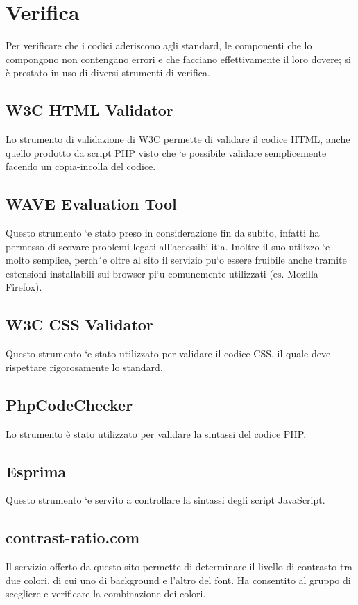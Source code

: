 \section{Verifica}

Per verificare che i codici aderiscono agli standard, le componenti che lo compongono non contengano errori e
che facciano effettivamente il loro dovere; si è prestato in uso di diversi strumenti di verifica.

\subsection{W3C HTML Validator}
Lo strumento di validazione di W3C permette di validare il codice HTML, anche quello prodotto da
script PHP visto che `e possibile validare semplicemente facendo un copia-incolla del codice.

\subsection{WAVE Evaluation Tool}
Questo strumento `e stato preso in considerazione fin da subito, infatti ha permesso di scovare problemi
legati all’accessibilit`a. Inoltre il suo utilizzo `e molto semplice, perch´e oltre al sito il servizio pu`o
essere fruibile anche tramite estensioni installabili sui browser pi`u comunemente utilizzati (es. Mozilla
Firefox).

\subsection{W3C CSS Validator}
Questo strumento `e stato utilizzato per validare il codice CSS, il quale deve rispettare rigorosamente
lo standard.

\subsection{PhpCodeChecker}
Lo strumento è stato utilizzato per validare la sintassi del codice PHP.

\subsection{Esprima}
Questo strumento `e servito a controllare la sintassi degli script JavaScript.

\subsection{contrast-ratio.com}
Il servizio offerto da questo sito permette di determinare il livello di contrasto tra due colori, di cui
uno di background e l’altro del font. Ha consentito al gruppo di scegliere e verificare la
combinazione dei colori.
